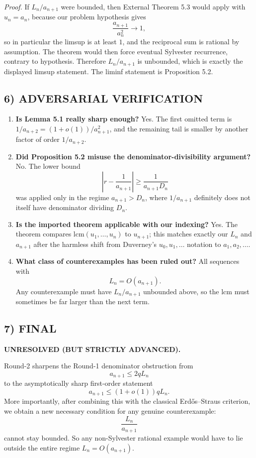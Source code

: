 \emph{Proof.}
If $L_n/a_{n+1}$ were bounded, then External Theorem 5.3 would apply with $u_n=a_n$, because our problem hypothesis gives
\[
 \frac{a_{n+1}}{a_n^2}\to 1,
\]
so in particular the limsup is at least $1$, and the reciprocal sum is rational by assumption. The theorem would then force eventual Sylvester recurrence, contrary to hypothesis. Therefore $L_n/a_{n+1}$ is unbounded, which is exactly the displayed limsup statement. The liminf statement is Proposition 5.2.

\subsection*{6) ADVERSARIAL VERIFICATION}
\begin{enumerate}
\item \textbf{Is Lemma 5.1 really sharp enough?} Yes. The first omitted term is $1/a_{n+2}=(1+o(1))/a_{n+1}^2$, and the remaining tail is smaller by another factor of order $1/a_{n+2}$.
\item \textbf{Did Proposition 5.2 misuse the denominator-divisibility argument?} No. The lower bound
\[
\left|r-\frac{1}{a_{n+1}}\right|\ge \frac{1}{a_{n+1}D_n}
\]
was applied only in the regime $a_{n+1}>D_n$, where $1/a_{n+1}$ definitely does not itself have denominator dividing $D_n$.
\item \textbf{Is the imported theorem applicable with our indexing?} Yes. The theorem compares $\mathrm{lcm}(u_1,\dots,u_n)$ to $u_{n+1}$; this matches exactly our $L_n$ and $a_{n+1}$ after the harmless shift from Duverney's $u_0,u_1,\dots$ notation to $a_1,a_2,\dots$.
\item \textbf{What class of counterexamples has been ruled out?} All sequences with
\[
 L_n=O(a_{n+1}).
\]
Any counterexample must have $L_n/a_{n+1}$ unbounded above, so the lcm must sometimes be far larger than the next term.
\end{enumerate}

\subsection*{7) FINAL}
\textbf{UNRESOLVED (BUT STRICTLY ADVANCED).}

Round-2 sharpens the Round-1 denominator obstruction from
\[
 a_{n+1}\le 2qL_n
\]
to the asymptotically sharp first-order statement
\[
 a_{n+1}\le (1+o(1))qL_n.
\]
More importantly, after combining this with the classical Erd\H{o}s--Straus criterion, we obtain a new necessary condition for any genuine counterexample:
\[
 \frac{L_n}{a_{n+1}}
\]
cannot stay bounded. So any non-Sylvester rational example would have to lie outside the entire regime $L_n=O(a_{n+1})$.

